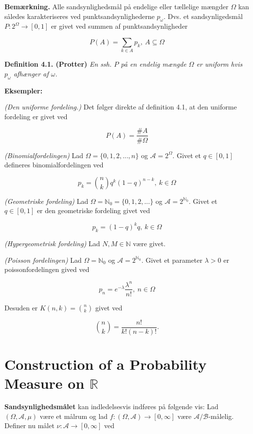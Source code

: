 \documentclass[a4paper,12pt,openany]{book}
\begin{document}
\textbf{Bemærkning.} Alle sandsynlighedsmål på endelige eller tællelige mængder \(\Omega\) kan således karakteriseres ved punktsandsynlighederne \(p_\omega\). Dvs. et sandsynligedsmål \(P : 2^\Omega \to [0,1]\) er givet ved summen af punktsandsynligheder

\[
P(A)=\sum_{k\in A}p_k,\ A\subseteq\Omega
\]

\textbf{Definition 4.1. (Protter)} \emph{En ssh. \(P\) på en endelig mængde \(\Omega\) er uniform hvis \(p_\omega\) afhænger af \(\omega\).}

\textbf{Eksempler:}

\emph{(Den uniforme fordeling.)} Det følger direkte af definition 4.1, at den uniforme fordeling er givet ved

\[
P(A)=\frac{\#A}{\#\Omega}
\]

\emph{(Binomialfordelingen)} Lad \(\Omega=\{0,1,2,...,n\}\) og \(\mathcal{A}=2^\Omega\). Givet et \(q\in[0,1]\) defineres binomialfordelingen ved

\[
p_k={n\choose k}q^k(1-q)^{n-k},\ k\in\Omega
\]

\emph{(Geometriske fordeling)} Lad \(\Omega=\mathbb{N}_0=\{0,1,2,...\}\) og \(\mathcal{A}=2^{\mathbb{N}_0}\). Givet et \(q\in[0,1]\) er den geometriske fordeling givet ved

\[
p_k=(1-q)^kq,\ k\in\Omega
\]

\emph{(Hypergeometrisk fordeling)} Lad \(N,M\in\mathbb{N}\) være givet.

\emph{(Poisson fordelingen)} Lad \(\Omega=\mathbb{N}_0\) og \(\mathcal{A}=2^{\mathbb{N}_0}\). Givet et parameter \(\lambda>0\) er poissonfordelingen gived ved

\[
p_n=e^{-\lambda}\frac{\lambda^n}{n!},\ n\in\Omega
\]

Desuden er \(K(n,k)={n\choose k}\) givet ved

\[
{n\choose k}=\frac{n!}{k!(n-k)!}.
\]

\hypertarget{construction-of-a-probability-measure-on-mathbb-r}{%
\section{\texorpdfstring{Construction of a Probability Measure on \(\mathbb R\)}{Construction of a Probability Measure on \textbackslash mathbb R}}\label{construction-of-a-probability-measure-on-mathbb-r}}

\textbf{Sandsynlighedsmålet} kan indledelsesvis indføres på følgende vis: Lad \((\Omega, \mathcal{A},\mu)\) være et målrum og lad \(f : (\Omega,\mathcal{A}) \to [0,\infty]\) være \(\mathcal{A}/\mathcal{B}\)-målelig. Definer nu målet \(\nu : \mathcal{A} \to [0,\infty]\) ved
\end{document}
